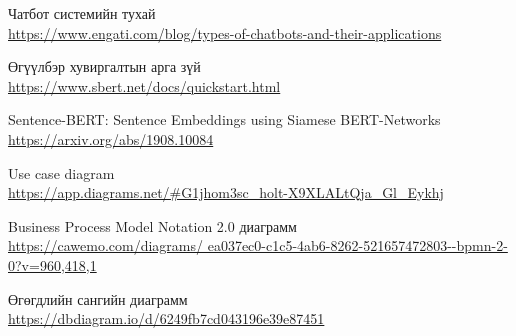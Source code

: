 \singlespace
{}
\begin{thebibliography}{99}
	Чатбот системийн тухай
	\\\url{https://www.engati.com/blog/types-of-chatbots-and-their-applications}

	Өгүүлбэр хувиргалтын арга зүй
	\\\url{https://www.sbert.net/docs/quickstart.html}
	
	Sentence-BERT: Sentence Embeddings using Siamese BERT-Networks
	\\\url{https://arxiv.org/abs/1908.10084}

	Use case diagram
	\\\url{https://app.diagrams.net/#G1jhom3sc_holt-X9XLALtQja_Gl_Eykhj}

	Business Process Model Notation 2.0 диаграмм
	\\\url{https://cawemo.com/diagrams/
	ea037ec0-c1c5-4ab6-8262-521657472803--bpmn-2-0?v=960,418,1}

	Өгөгдлийн сангийн диаграмм
	\\\url{https://dbdiagram.io/d/6249fb7cd043196e39e87451}
\end{thebibliography}
